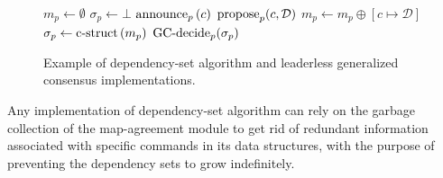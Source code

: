 \begin{figure*}
{{\begin{varwidth}{\dimexpr{}\fboxrule\relax}
    
		\begin{algorithmic}[1]
			{\scriptsize
			\State $m_p\gets \emptyset$
			\State $\sigma_p\gets \bot$
			\END
			 $\operatorname{announce}_p\left( c \right)$
			\END
			\Statex
			\State  $\operatorname{propose}_p( c,\mathcal{D})$ 			
			\END
			\Statex
			\State  $m_p \gets m_p \oplus \left[ c \mapsto \mathcal{D}\right]$	
			\State $\sigma_p \gets  \operatorname{c-struct}\left(m_p\right)$
			\State $\operatorname{GC-decide}_p(\sigma_p)$		
			\END
			}
		\end{algorithmic}
	\end{varwidth}%
}
\label{fig:deps-set-algo3}
}
\caption{Example of dependency-set algorithm and leaderless generalized consensus implementations.}
\label{fig:deps-set-algo}
\end{figure*}



Any implementation of dependency-set algorithm can rely on the garbage collection of the map-agreement module to get rid of redundant information associated with specific commands in its data structures, with the purpose of preventing the dependency sets to grow indefinitely. 
 

